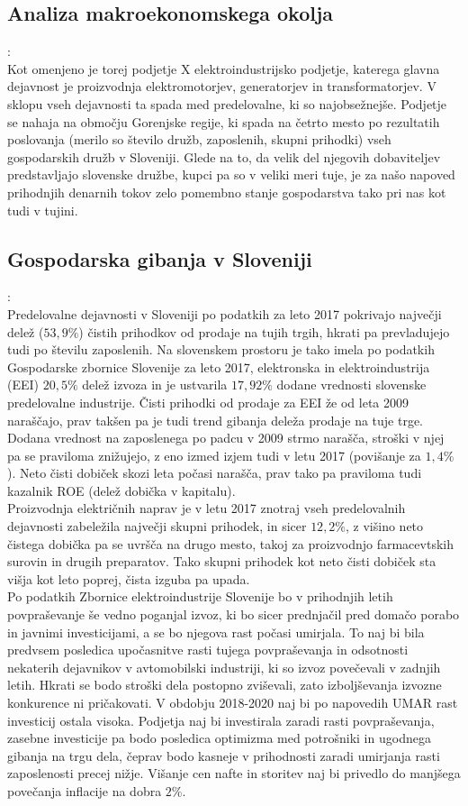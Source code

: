 \documentclass[12pt,a4paper]{amsart}
\theoremstyle{definition} %
\theoremstyle{plain} %
\begin{document}
\subsection{Analiza makroekonomskega okolja}:\\
Kot omenjeno je torej podjetje X elektroindustrijsko podjetje, katerega glavna dejavnost je proizvodnja elektromotorjev, generatorjev in transformatorjev. V sklopu vseh dejavnosti ta spada med predelovalne, ki so najobsežnejše. Podjetje se nahaja na območju Gorenjske regije, ki spada na četrto mesto po rezultatih poslovanja (merilo so število družb, zaposlenih, skupni prihodki) vseh gospodarskih družb v Sloveniji. Glede na to, da velik del njegovih dobaviteljev predstavljajo slovenske družbe, kupci pa so v veliki meri tuje, je za našo napoved prihodnjih denarnih tokov zelo pomembno stanje gospodarstva tako pri nas kot tudi v tujini.

\subsection{Gospodarska gibanja v Sloveniji}:\\
Predelovalne dejavnosti v Sloveniji po podatkih za leto 2017 pokrivajo največji delež ($53,9\%$) čistih prihodkov od prodaje na tujih trgih, hkrati pa prevladujejo tudi po številu zaposlenih. 
Na slovenskem prostoru je tako imela po podatkih Gospodarske zbornice Slovenije za leto 2017, elektronska in elektroindustrija (EEI) $20,5\%$ delež izvoza in je ustvarila $17,92\%$ dodane vrednosti slovenske predelovalne industrije. Čisti prihodki od prodaje za EEI že od leta 2009 naraščajo, prav takšen pa je tudi trend gibanja deleža prodaje na tuje trge. Dodana vrednost na zaposlenega po padcu v 2009 strmo narašča, stroški v njej pa se praviloma znižujejo, z eno izmed izjem tudi v letu 2017 (povišanje za $1,4\%$). Neto čisti dobiček skozi leta počasi narašča, prav tako pa praviloma tudi kazalnik ROE (delež dobička v kapitalu).\\
Proizvodnja električnih naprav je v letu 2017 znotraj vseh predelovalnih dejavnosti zabeležila največji skupni prihodek, in sicer $12,2\%$, z višino neto čistega dobička pa se uvršča na drugo mesto, takoj za proizvodnjo farmacevtskih surovin in drugih preparatov. Tako skupni prihodek kot neto čisti dobiček sta višja kot leto poprej, čista izguba pa upada.\\
Po podatkih Zbornice elektroindustrije Slovenije bo v prihodnjih letih povpraševanje še vedno poganjal izvoz, ki bo sicer prednjačil pred domačo porabo in javnimi investicijami, a se bo njegova rast počasi umirjala. To naj bi bila predvsem posledica upočasnitve rasti tujega povpraševanja in odsotnosti nekaterih dejavnikov v avtomobilski industriji, ki so izvoz povečevali v zadnjih letih. Hkrati se bodo stroški dela postopno zviševali, zato izboljševanja izvozne konkurence ni pričakovati. V obdobju 2018-2020 naj bi po napovedih UMAR rast investicij ostala visoka. Podjetja naj bi investirala zaradi rasti povpraševanja, zasebne investicije pa bodo posledica optimizma med potrošniki in ugodnega gibanja na trgu dela, čeprav bodo kasneje v prihodnosti zaradi umirjanja rasti zaposlenosti precej nižje. Višanje cen nafte in storitev naj bi privedlo do manjšega povečanja inflacije na dobra $2\%$.
\end{document}
